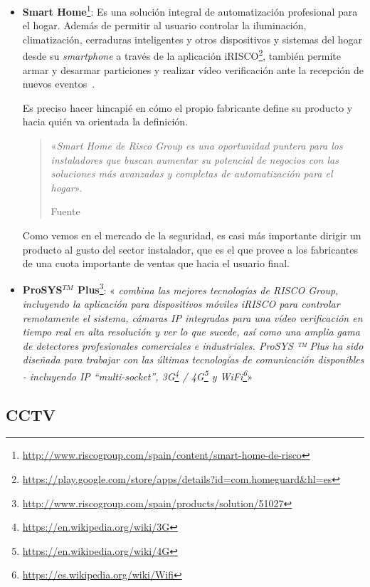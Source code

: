 \begin{itemize}
\item \textbf{Smart Home}\footnote{\url{http://www.riscogroup.com/spain/content/smart-home-de-risco}}: Es una solución integral de automatización profesional para el hogar. Además de permitir al usuario controlar la iluminación, climatización, cerraduras inteligentes y otros dispositivos y sistemas del hogar desde su \textit{smartphone} a través de la aplicación iRISCO\footnote{\url{https://play.google.com/store/apps/details?id=com.homeguard&hl=es}}, también permite armar y desarmar particiones y realizar vídeo verificación ante la recepción de nuevos eventos~\cite{RiscoGroupSmartHome}.

Es preciso hacer hincapié en cómo el propio fabricante define su producto y hacia quién va orientada la definición. 

\begin{quote}
«\textit{Smart Home de Risco Group es una oportunidad puntera para los instaladores que buscan aumentar su potencial de negocios con las soluciones más avanzadas y completas de automatización para el hogar}».
\par\nointerlineskip\noindent\hfill Fuente~\cite{RiscoGroupSmartHome}
\end{quote}

Como vemos en el mercado de la seguridad, es casi más importante dirigir un producto al gusto del sector instalador, que es el que provee a los fabricantes de una cuota importante de ventas que hacia el usuario final.

\item \textbf{ProSYS$^{TM}$ Plus}\footnote{\url{http://www.riscogroup.com/spain/products/solution/51027}}: «\textit{ combina las mejores tecnologías de RISCO Group, incluyendo la aplicación para dispositivos móviles iRISCO para controlar remotamente el sistema, cámaras IP integradas para una vídeo verificación en tiempo real en alta resolución y ver lo que sucede, así como una amplia gama de detectores profesionales comerciales e industriales.  ProSYS ™ Plus ha sido diseñada para trabajar con las últimas tecnologías de comunicación disponibles - incluyendo IP “multi-socket”, 3G\footnote{\url{https://en.wikipedia.org/wiki/3G}} / 4G\footnote{\url{https://en.wikipedia.org/wiki/4G}} y WiFi\footnote{\url{https://es.wikipedia.org/wiki/Wifi}}}»
\end{itemize}

\subsection{\acf{CCTV}}

